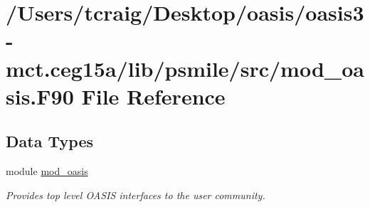 \hypertarget{mod__oasis_8_f90}{\section{/\+Users/tcraig/\+Desktop/oasis/oasis3-\/mct.ceg15a/lib/psmile/src/mod\+\_\+oasis.F90 File Reference}
\label{mod__oasis_8_f90}
}
\subsection*{Data Types}
\begin{DoxyCompactItemize}
\item 
module \hyperlink{classmod__oasis}{mod\+\_\+oasis}
\begin{DoxyCompactList}\small\item\em Provides top level O\+A\+S\+I\+S interfaces to the user community. \end{DoxyCompactList}\end{DoxyCompactItemize}
